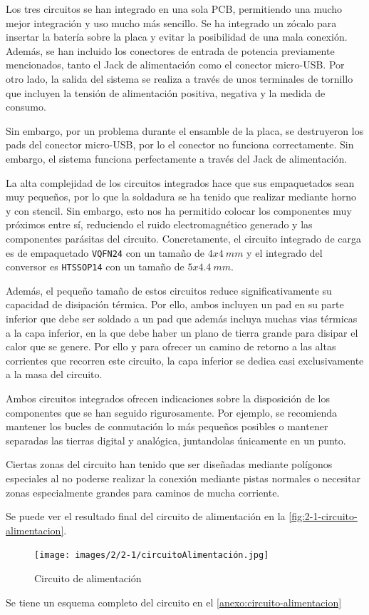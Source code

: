 Los tres circuitos se han integrado en una sola PCB, permitiendo una mucho mejor integración y uso mucho más sencillo. Se ha integrado un zócalo para insertar la batería sobre la placa y evitar la posibilidad de una mala conexión. Además, se han incluido los conectores de entrada de potencia previamente mencionados, tanto el Jack de alimentación como el conector micro-USB. Por otro lado, la salida del sistema se realiza a través de unos terminales de tornillo que incluyen la tensión de alimentación positiva, negativa y la medida de consumo.

Sin embargo, por un problema durante el ensamble de la placa, se destruyeron los pads del conector micro-USB, por lo el conector no funciona correctamente. Sin embargo, el sistema funciona perfectamente a través del Jack de alimentación.

La alta complejidad de los circuitos integrados hace que sus empaquetados sean muy pequeños, por lo que la soldadura se ha tenido que realizar mediante horno y con stencil. Sin embargo, esto nos ha permitido colocar los componentes muy próximos entre sí, reduciendo el ruido electromagnético generado y las componentes parásitas del circuito. Concretamente, el circuito integrado de carga es de empaquetado \texttt{VQFN24} con un tamaño de $4x4\ mm$ y el integrado del conversor es \texttt{HTSSOP14} con un tamaño de $5x4.4\ mm$.

Además, el pequeño tamaño de estos circuitos reduce significativamente su capacidad de disipación térmica. Por ello, ambos incluyen un pad en su parte inferior que debe ser soldado a un pad que además incluya muchas vias térmicas a la capa inferior, en la que debe haber un plano de tierra grande para disipar el calor que se genere. Por ello y para ofrecer un camino de retorno a las altas corrientes que recorren este circuito, la capa inferior se dedica casi exclusivamente a la masa del circuito. 

Ambos circuitos integrados ofrecen indicaciones sobre la disposición de los componentes que se han seguido rigurosamente. Por ejemplo, se recomienda mantener los bucles de conmutación lo más pequeños posibles o mantener separadas las tierras digital y analógica, juntandolas únicamente en un punto. 

Ciertas zonas del circuito han tenido que ser diseñadas mediante polígonos especiales al no poderse realizar la conexión mediante pistas normales o necesitar zonas especialmente grandes para caminos de mucha corriente.

Se puede ver el resultado final del circuito de alimentación en la \autoref{fig:2-1-circuito-alimentacion}.

\begin{figure}[h]
    \centering
    \texttt{[image: images/2/2-1/circuitoAlimentación.jpg]}
    \caption{Circuito de alimentación}
    \label{fig:2-1-circuito-alimentacion}
\end{figure}

Se tiene un esquema completo del circuito en el \autoref{anexo:circuito-alimentacion}